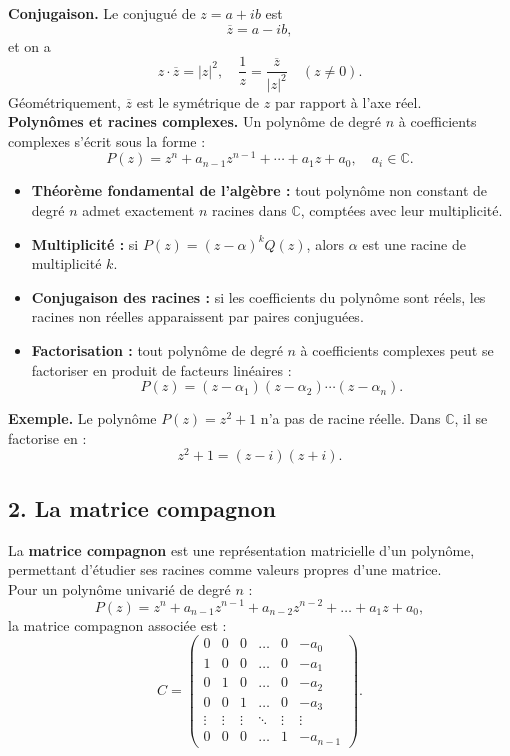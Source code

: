 \newpage

\textbf{Conjugaison.}
Le conjugué de \( z = a+ib \) est
\[
\overline{z} = a - ib,
\]
et on a
\[
z \cdot \overline{z} = |z|^2, 
\quad
\frac{1}{z} = \frac{\overline{z}}{|z|^2} \quad (z \neq 0).
\]
Géométriquement, \( \overline{z} \) est le symétrique de \( z \) par rapport à l’axe réel. \\

\textbf{Polynômes et racines complexes.}
Un polynôme de degré \( n \) à coefficients complexes s’écrit sous la forme :
\[
P(z) = z^n + a_{n-1}z^{n-1} + \cdots + a_1z + a_0, 
\quad a_i \in \mathbb{C}.
\]

\begin{itemize}
    \item \textbf{Théorème fondamental de l’algèbre :} 
    tout polynôme non constant de degré \(n\) admet exactement \(n\) racines dans \(\mathbb{C}\), comptées avec leur multiplicité.
    
    \item \textbf{Multiplicité :} 
    si \(P(z) = (z - \alpha)^k Q(z)\), alors \(\alpha\) est une racine de multiplicité \(k\).
    
    \item \textbf{Conjugaison des racines :} 
    si les coefficients du polynôme sont réels, les racines non réelles apparaissent par paires conjuguées.
    
    \item \textbf{Factorisation :} 
    tout polynôme de degré \(n\) à coefficients complexes peut se factoriser en produit de facteurs linéaires :
    \[
    P(z) = (z - \alpha_1)(z - \alpha_2)\cdots(z - \alpha_n).
    \]
\end{itemize}

\textbf{Exemple.}  
Le polynôme \(P(z) = z^2 + 1\) n’a pas de racine réelle.  
Dans \(\mathbb{C}\), il se factorise en :
\[
z^2 + 1 = (z - i)(z + i).
\]

\subsection*{2. La matrice compagnon}

La \textbf{matrice compagnon} est une représentation matricielle d’un polynôme, 
permettant d’étudier ses racines comme valeurs propres d’une matrice. \\

Pour un polynôme univarié de degré \(n\) :
\[
P(z) = z^n + a_{n-1}z^{n-1} + a_{n-2}z^{n-2} + \dots + a_1z + a_0,
\]
la matrice compagnon associée est :
\[
C = 
\begin{pmatrix}
0 & 0 & 0 & \dots & 0 & -a_0 \\
1 & 0 & 0 & \dots & 0 & -a_1 \\
0 & 1 & 0 & \dots & 0 & -a_2 \\
0 & 0 & 1 & \dots & 0 & -a_3 \\
\vdots & \vdots & \vdots & \ddots & \vdots & \vdots \\
0 & 0 & 0 & \dots & 1 & -a_{n-1}
\end{pmatrix}.
\]

